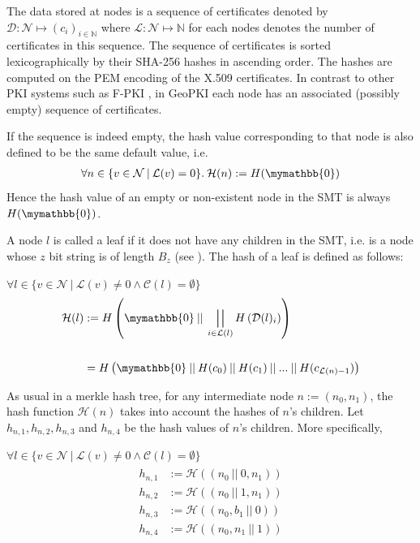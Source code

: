 \documentclass[10pt,conference,compsocconf]{IEEEtran}
\newcommand{\mathbbzero}{\mymathbb{0}}
\DeclareMathOperator*{\concat}{\scalerel*{||}{\sum}}
\begin{document}
The data stored at nodes is a sequence of certificates denoted by $\mathcal{D}: \mathcal{N} \mapsto \left(c_i\right)_{i \in \mathbb{N}}$ where $\mathcal{L}: \mathcal{N} \mapsto \mathbb{N}$ for each nodes denotes the number of certificates in this sequence.
The sequence of certificates is sorted lexicographically by their SHA-256 hashes in ascending order.
The hashes are computed on the PEM encoding of the X.509 certificates.
In contrast to other PKI systems such as F-PKI \cite{chuat_f-pki_2022}, in GeoPKI each node has an associated (possibly empty) sequence of certificates.

If the sequence is indeed empty, the hash value corresponding to that node is also defined to be the same default value, i.e.
\begin{align}
	\forall n \in \{v \in \mathcal{N} \:|\: \mathcal{L}(v) = 0\}. \: \mathcal{H}(n) := H(\mathbbzero)
\end{align}
Hence the hash value of an empty or non-existent node in the SMT is always $H(\mathbbzero)$.

A node $l$ is called a leaf if it does not have any children in the SMT, i.e. is a node whose $z$ bit string is of length $B_z$ (see ).
The hash of a leaf is defined as follows:

$\forall l \in \{v \in \mathcal{N} \: | \: \mathcal{L}(v) \neq 0 \land \mathcal{C}(l) = \emptyset \}$
\begin{align}
\label{eq:hash-leaf}
\begin{split}
	\mathcal{H}(l) &:= H\left(\mathbbzero \: || \: \concat_{i \in \mathcal{L}(l)} H\left(\mathcal{D}(l)_i\right) \right)\\
	\\%
	&= H\left(\mathbbzero \:||\: H(c_0) \:||\: H(c_1) \:||\: ... \:||\: H(c_{\mathcal{L}(n)-1}) \right)
\end{split}
\end{align}

As usual in a merkle hash tree, for any intermediate node $n := (n_0, n_1)$, the hash function $\mathcal{H}(n)$ takes into account the hashes of $n$'s children.
Let $h_{n,1}, h_{n,2}, h_{n,3}$ and $h_{n,4}$ be the hash values of $n$'s children.
More specifically,

$\forall l \in \{v \in \mathcal{N} \: | \: \mathcal{L}(v) \neq 0 \land \mathcal{C}(l) = \emptyset \}$
\begin{align}
\begin{split}
	h_{n,1} &:= \mathcal{H}\left(\left(n_0 \:||\: 0, n_1\right)\right)
	\\
	h_{n,2} &:= \mathcal{H}\left(\left(n_0 \:||\: 1, n_1\right)\right)
	\\
	h_{n,3} &:= \mathcal{H}\left(\left(n_0, b_1 \:||\: 0\right)\right)
	\\
	h_{n,4} &:= \mathcal{H}\left(\left(n_0, n_1 \:||\: 1\right)\right)
\end{split}
\end{align}
\end{document}
